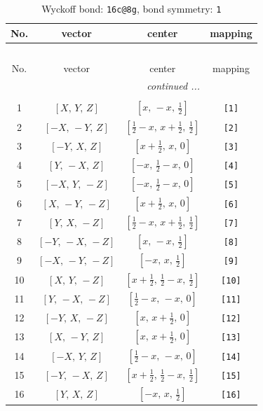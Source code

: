 \documentclass[fleqn,8pt]{jsarticle}
\begin{document}
\begin{longtable}{cccc}
\caption{Wyckoff bond: {\tt 16c@8g}, bond symmetry: {\tt 1}}
 \\
 \hline \hline
No. & vector & center & mapping \\ \hline \endfirsthead

\multicolumn{3}{l}{\tablename\ \thetable{}} \\
 \hline \hline
No. & vector & center & mapping \\ \hline \endhead

 \hline \hline
\multicolumn{3}{r}{\footnotesize\it continued ...} \\ \endfoot

 \hline \hline
\multicolumn{3}{r}{} \\ \endlastfoot

1 & $\left[ X,\, Y,\, Z \right]$ & $\left[ x,\, - x,\, \frac{1}{2} \right]$ & {\tt [1]} \\ \hline
2 & $\left[ - X,\, - Y,\, Z \right]$ & $\left[ \frac{1}{2} - x,\, x + \frac{1}{2},\, \frac{1}{2} \right]$ & {\tt [2]} \\ \hline
3 & $\left[ - Y,\, X,\, Z \right]$ & $\left[ x + \frac{1}{2},\, x,\, 0 \right]$ & {\tt [3]} \\ \hline
4 & $\left[ Y,\, - X,\, Z \right]$ & $\left[ - x,\, \frac{1}{2} - x,\, 0 \right]$ & {\tt [4]} \\ \hline
5 & $\left[ - X,\, Y,\, - Z \right]$ & $\left[ - x,\, \frac{1}{2} - x,\, 0 \right]$ & {\tt [5]} \\ \hline
6 & $\left[ X,\, - Y,\, - Z \right]$ & $\left[ x + \frac{1}{2},\, x,\, 0 \right]$ & {\tt [6]} \\ \hline
7 & $\left[ Y,\, X,\, - Z \right]$ & $\left[ \frac{1}{2} - x,\, x + \frac{1}{2},\, \frac{1}{2} \right]$ & {\tt [7]} \\ \hline
8 & $\left[ - Y,\, - X,\, - Z \right]$ & $\left[ x,\, - x,\, \frac{1}{2} \right]$ & {\tt [8]} \\ \hline
9 & $\left[ - X,\, - Y,\, - Z \right]$ & $\left[ - x,\, x,\, \frac{1}{2} \right]$ & {\tt [9]} \\ \hline
10 & $\left[ X,\, Y,\, - Z \right]$ & $\left[ x + \frac{1}{2},\, \frac{1}{2} - x,\, \frac{1}{2} \right]$ & {\tt [10]} \\ \hline
11 & $\left[ Y,\, - X,\, - Z \right]$ & $\left[ \frac{1}{2} - x,\, - x,\, 0 \right]$ & {\tt [11]} \\ \hline
12 & $\left[ - Y,\, X,\, - Z \right]$ & $\left[ x,\, x + \frac{1}{2},\, 0 \right]$ & {\tt [12]} \\ \hline
13 & $\left[ X,\, - Y,\, Z \right]$ & $\left[ x,\, x + \frac{1}{2},\, 0 \right]$ & {\tt [13]} \\ \hline
14 & $\left[ - X,\, Y,\, Z \right]$ & $\left[ \frac{1}{2} - x,\, - x,\, 0 \right]$ & {\tt [14]} \\ \hline
15 & $\left[ - Y,\, - X,\, Z \right]$ & $\left[ x + \frac{1}{2},\, \frac{1}{2} - x,\, \frac{1}{2} \right]$ & {\tt [15]} \\ \hline
16 & $\left[ Y,\, X,\, Z \right]$ & $\left[ - x,\, x,\, \frac{1}{2} \right]$ & {\tt [16]} \\
\end{longtable}
\end{document}

